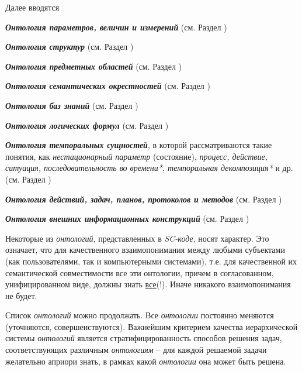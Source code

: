 \begin{SCn}
{Далее вводятся 
\begin{scnitemize}
    \item \textbf{\textit{Онтология параметров, величин и измерений}} (см. Раздел \textit{}) 
    \item \textbf{\textit{Онтология структур}} (см. Раздел \textit{})
    \begin{scnitemizeii}
    \item \textit{\textbf{Онтология предметных областей}} (см. Раздел \textit{})
    \item \textit{\textbf{Онтология семантических окрестностей}} (см. Раздел \textit{})
    \item \textit{\textbf{Онтология баз знаний}} (см. Раздел \textit{})
    \end{scnitemizeii} 
    \item \textit{\textbf{Онтология логических формул}} (см. Раздел \textit{})
    \item \textit{\textbf{Онтология темпоральных сущностей}}, в которой рассматриваются такие понятия, как \textit{нестационарный параметр} (состояние), \textit{процесс, действие, ситуация, последовательность во времени*, темпоральная декомпозиция*} и др. (см. Раздел \textit{})
    \begin{scnitemizeii}
    \item \textbf{\textit{Онтология действий, задач, планов, протоколов и методов}} (см. Раздел \textit{})
    \end{scnitemizeii}
    \item \textit{\textbf{Онтология внешних информационных конструкций}} (см. Раздел \textit{})
\end{scnitemize}


Некоторые из \textit{онтологий}, представленных в \textit{SC-коде}, носят  характер. Это означает, что для качественного взаимопонимания между любыми субъектами (как пользователями, так и компьютерными системами), т.е. для качественной их семантической совместимости все эти  онтологии, причем в согласованном, унифицированном виде, должны знать \uline{все}(!). Иначе никакого взаимопонимания не будет.

Список \textit{онтологий} можно продолжать. Все \textit{онтологии} постоянно меняются (уточняются, совершенствуются). Важнейшим критерием качества иерархической системы \textit{онтологий} является стратифицированность способов решения задач, соответствующих различным \textit{онтологиям} -- для каждой решаемой задачи желательно априори знать, в рамках какой \textit{онтологии} она может быть решена.

}
\end{SCn}
